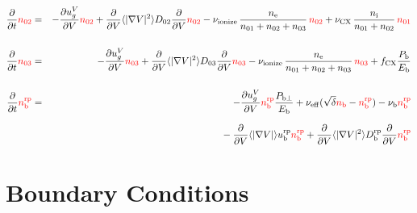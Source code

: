 \documentclass[11pt]{article}
\def\r#1{{\rm#1}}
\def\aves#1{\langle#1\rangle}
\def\dd#1#2{\frac{\partial #1}{\partial #2}}
\def\ddV{\frac{\partial}{\partial V}}
\def\ddt{\frac{\partial}{\partial t}}
\def\nee{n_\r{e}}
\def\ni{n_\r{i}}
\def\nb{n_\r{b}}
\def\ugV{u_{g}^V}
\def\nbrp{n_\r{b}^\r{rp}}
\def\ubrp{u_\r{b}^\r{rp}}
\def\Dbrp{D_\r{b}^\r{rp}}
\def\Pbperp{P_{\r{b}\perp}}
\def\Pb{P_\r{b}}
\def\Eb{E_\r{b}}
\def\nna{n_{01}}
\def\nnb{n_{02}}
\def\nnc{n_{03}}
\def\nueff{\nu_\r{eff}}
\def\fCX{f_\r{CX}}
\def\nuCX{\nu_\r{CX}}
\def\nuion{\nu_\r{ionize}}
\def\nub{\nu_\r{b}}
\def\red#1{\textcolor{red}{#1}}
\begin{document}
\begin{eqnarray}
  \ddt \red{\nnb} &=& 
%
  - \dd{\ugV}{V} \red{\nnb}
%
  + \ddV \aves{|\nabla V|^2} D_{02} \ddV \red{\nnb}
%
  - \nuion\, \frac{\nee}{\nna + \nnb + \nnc}\, \red{\nnb}
%
  + \nuCX\, \frac{\ni}{\nna + \nnb}\, \red{\nna}
%
\\[5mm]
  \ddt \red{\nnc} &=& 
%
  - \dd{\ugV}{V} \red{\nnc}
%
  + \ddV \aves{|\nabla V|^2} D_{03} \ddV \red{\nnc}
%
  - \nuion\, \frac{\nee}{\nna + \nnb + \nnc}\, \red{\nnc}
%
  + \fCX \frac{\Pb}{\Eb}
\\[5mm]
  \ddt \red{\nbrp} &=&
%
  - \dd{\ugV}{V} \red{\nbrp}
%
    \frac{\Pbperp}{\Eb}
%
  + \nueff (\sqrt{\delta} \red{\nb} - \red{\nbrp})
%
  - \nub \red{\nbrp}
%
\nonumber\\[2.5mm]&&{}
  - \ddV \aves{|\nabla V|} \ubrp \red{\nbrp} 
  + \ddV \aves{|\nabla V|^2} \Dbrp \ddV \red{\nbrp}
\end{eqnarray}

\bigskip

\section{Boundary Conditions}
\end{document}
